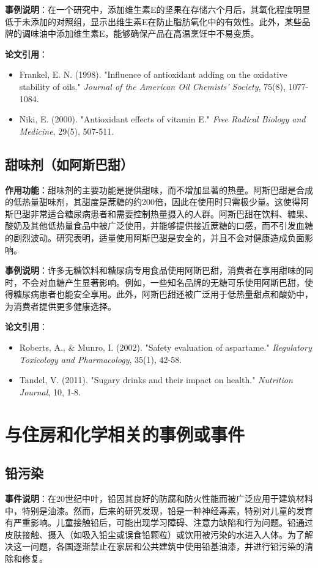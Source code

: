 \documentclass[UTF8]{report}
\theoremstyle{MyLineTheoremStyle} %
\theoremstyle{MyBlockTheoremStyle} %
\theoremstyle{MySubsubsectionStyle} %
\begin{document}
\textbf{事例说明}：在一个研究中，添加维生素E的坚果在存储六个月后，其氧化程度明显低于未添加的对照组，显示出维生素E在防止脂肪氧化中的有效性。此外，某些品牌的调味油中添加维生素E，能够确保产品在高温烹饪中不易变质。

\textbf{论文引用}：
\begin{itemize}
    \item Frankel, E. N. (1998). "Influence of antioxidant adding on the oxidative stability of oils." \textit{Journal of the American Oil Chemists' Society}, 75(8), 1077-1084.
    \item Niki, E. (2000). "Antioxidant effects of vitamin E." \textit{Free Radical Biology and Medicine}, 29(5), 507-511.
\end{itemize}

\subsection{甜味剂（如阿斯巴甜）}
\textbf{作用功能}：甜味剂的主要功能是提供甜味，而不增加显著的热量。阿斯巴甜是合成的低热量甜味剂，其甜度是蔗糖的约200倍，因此在使用时只需极少量。这使得阿斯巴甜非常适合糖尿病患者和需要控制热量摄入的人群。阿斯巴甜在饮料、糖果、酸奶及其他低热量食品中被广泛使用，并能够提供接近蔗糖的口感，而不引发血糖的剧烈波动。研究表明，适量使用阿斯巴甜是安全的，并且不会对健康造成负面影响。

\textbf{事例说明}：许多无糖饮料和糖尿病专用食品使用阿斯巴甜，消费者在享用甜味的同时，不会对血糖产生显著影响。例如，一些知名品牌的无糖可乐使用阿斯巴甜，使得糖尿病患者也能安全享用。此外，阿斯巴甜还被广泛用于低热量甜点和酸奶中，为消费者提供更多健康选择。

\textbf{论文引用}：
\begin{itemize}
    \item Roberts, A., \& Munro, I. (2002). "Safety evaluation of aspartame." \textit{Regulatory Toxicology and Pharmacology}, 35(1), 42-58.
    \item Tandel, V. (2011). "Sugary drinks and their impact on health." \textit{Nutrition Journal}, 10, 1-8.
\end{itemize}

\section{与住房和化学相关的事例或事件}

\subsection{铅污染}
\textbf{事件说明}：在20世纪中叶，铅因其良好的防腐和防火性能而被广泛应用于建筑材料中，特别是油漆。然而，后来的研究发现，铅是一种神经毒素，特别对儿童的发育有严重影响。儿童接触铅后，可能出现学习障碍、注意力缺陷和行为问题。铅通过皮肤接触、摄入（如吸入铅尘或误食铅颗粒）或饮用被污染的水进入人体。为了解决这一问题，各国逐渐禁止在家居和公共建筑中使用铅基油漆，并进行铅污染的清除和修复。
\end{document}
